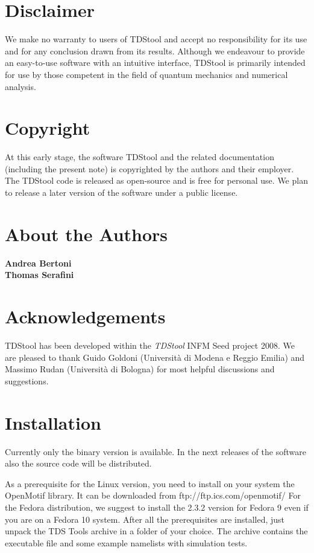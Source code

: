 \documentclass[a4paper,11pt]{article}
\begin{document}
\section*{Disclaimer}
We make no warranty to users of TDStool and accept no responsibility for
its use and for any conclusion drawn from its results.  Although we endeavour
to provide an easy-to-use software with an intuitive interface, TDStool is
primarily intended for use by those competent in the field of quantum mechanics
and numerical analysis.

\section*{Copyright}
At this early stage, the software TDStool and the related documentation
(including the present note) is copyrighted by the authors and their
employer.  The TDStool code is released as open-source and is free for
personal use.  We plan to release a later version of the software under
a public license.


\section*{About the Authors}

{\bf Andrea Bertoni} %
\\
{\bf Thomas Serafini} %

\section*{Acknowledgements}
TDStool has been developed within the \emph{TDStool} INFM Seed project 2008.
We are pleased to thank Guido Goldoni (Universit\`a di Modena e Reggio Emilia)
and Massimo Rudan (Universit\`a di Bologna) for most helpful discussions and
suggestions.

\newpage

\tableofcontents

\newpage

\pagestyle{fancy}


\section{Installation}
Currently only the binary version is available.
In the next releases of the software also the source code will be distributed.

As a prerequisite for the Linux version, you need to install on your system the OpenMotif library. It can be downloaded from ftp://ftp.ics.com/openmotif/
For the Fedora distribution, we suggest to install the 2.3.2 version for Fedora 9 even if you are on a Fedora 10 system.
After all the prerequisites are installed, just unpack the TDS Tools archive in a folder of your choice. The archive contains the executable file and some example namelists with simulation tests.
\end{document}
